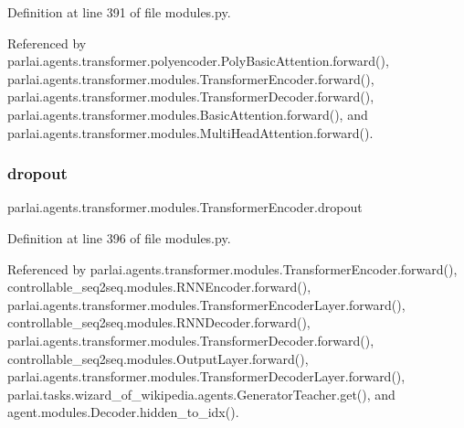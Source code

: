 Definition at line 391 of file modules.\+py.



Referenced by parlai.\+agents.\+transformer.\+polyencoder.\+Poly\+Basic\+Attention.\+forward(), parlai.\+agents.\+transformer.\+modules.\+Transformer\+Encoder.\+forward(), parlai.\+agents.\+transformer.\+modules.\+Transformer\+Decoder.\+forward(), parlai.\+agents.\+transformer.\+modules.\+Basic\+Attention.\+forward(), and parlai.\+agents.\+transformer.\+modules.\+Multi\+Head\+Attention.\+forward().

\mbox{\label{classparlai_1_1agents_1_1transformer_1_1modules_1_1TransformerEncoder_af28dbf5c6c0f70c1a032a3bbb5359661}} 
\subsubsection{\texorpdfstring{dropout}{dropout}}
{\footnotesize\ttfamily parlai.\+agents.\+transformer.\+modules.\+Transformer\+Encoder.\+dropout}



Definition at line 396 of file modules.\+py.



Referenced by parlai.\+agents.\+transformer.\+modules.\+Transformer\+Encoder.\+forward(), controllable\+\_\+seq2seq.\+modules.\+R\+N\+N\+Encoder.\+forward(), parlai.\+agents.\+transformer.\+modules.\+Transformer\+Encoder\+Layer.\+forward(), controllable\+\_\+seq2seq.\+modules.\+R\+N\+N\+Decoder.\+forward(), parlai.\+agents.\+transformer.\+modules.\+Transformer\+Decoder.\+forward(), controllable\+\_\+seq2seq.\+modules.\+Output\+Layer.\+forward(), parlai.\+agents.\+transformer.\+modules.\+Transformer\+Decoder\+Layer.\+forward(), parlai.\+tasks.\+wizard\+\_\+of\+\_\+wikipedia.\+agents.\+Generator\+Teacher.\+get(), and agent.\+modules.\+Decoder.\+hidden\+\_\+to\+\_\+idx().

\mbox{\label{classparlai_1_1agents_1_1transformer_1_1modules_1_1TransformerEncoder_a57f137ae98789edeae26de90118efdd6}} 
